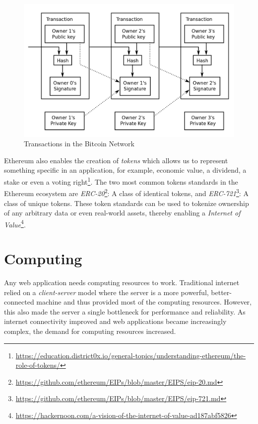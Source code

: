 	\begin{figure}[h]
		\includegraphics[width=\linewidth]{figures/bitcoin-transactions}
		\caption{\label{fig:bitcoin-transactions} Transactions in the Bitcoin Network\protect\footnotemark}
	\end{figure}
	
	Ethereum also enables the creation of \textit{tokens} which allows us to represent something specific in an application, for example, economic value, a dividend, a stake or even a voting right\footnote{\url{https://education.district0x.io/general-topics/understanding-ethereum/the-role-of-tokens/}}. The two most common tokens standards in the Ethereum ecosystem are \textit{ERC-20}\footnote{\url{https://github.com/ethereum/EIPs/blob/master/EIPS/eip-20.md}}: A class of identical tokens, and \textit{ERC-721}\footnote{\url{https://github.com/ethereum/EIPs/blob/master/EIPS/eip-721.md}}: A class of unique tokens. These token standards can be used to tokenize ownership of any arbitrary data or even real-world assets, thereby enabling a \textit{Internet of Value}\footnote{\url{https://hackernoon.com/a-vision-of-the-internet-of-value-ad187abf5826}}.
	
\section{Computing}
	Any web application needs computing resources to work. Traditional internet relied on a \textit{client-server} model where the server is a more powerful, better-connected machine and thus provided most of the computing resources. However, this also made the server a single bottleneck for performance and reliability\cite{crowcroft2003peer}. As internet connectivity improved and web applications became increasingly complex, the demand for computing resources increased.
	
